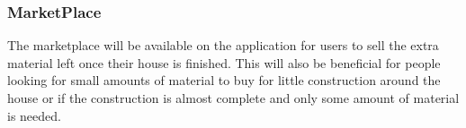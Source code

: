 \documentclass{article}
\begin{document}
\subsubsection*{MarketPlace}

The marketplace will be available on the application for users to sell the
extra material left once their house is finished. This will also be beneficial
for people looking for small amounts of material to buy for little construction
around the house or if the construction is almost complete and only some amount
of material is needed.
\end{document}
